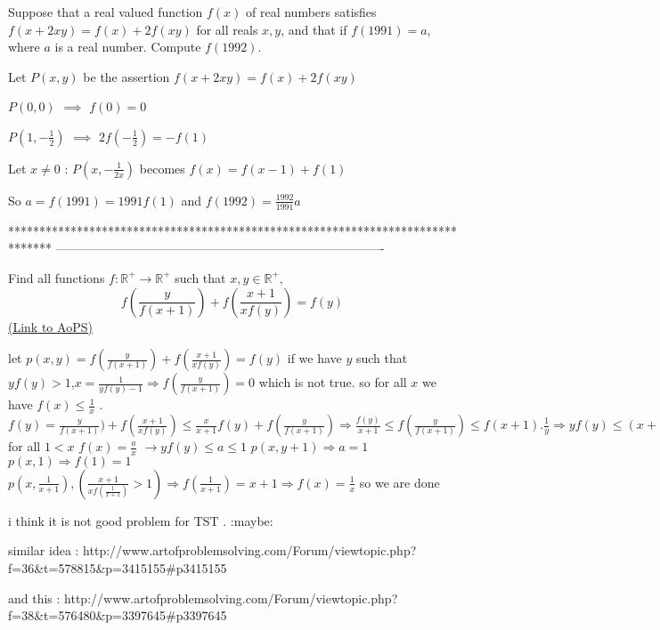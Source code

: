 \begin{solution}
	\begin{tcolorbox}Suppose that a real valued function $f(x)$ of real numbers satisfies
$f(x+2xy)=f(x)+2f(xy)$
for all reals $x,y$, and that if $f(1991)=a$, where $a$ is a real number. Compute $f(1992)$.\end{tcolorbox}
Let $P(x,y)$ be the assertion $f(x+2xy)=f(x)+2f(xy)$

$P(0,0)$ $\implies$ $f(0)=0$

$P(1,-\frac 12)$ $\implies$ $2f(-\frac 12)=-f(1)$

Let $x\ne 0$ : $P(x,-\frac 1{2x})$ becomes $f(x)=f(x-1)+f(1)$

So $a=f(1991)=1991f(1)$ and $\boxed{f(1992)=\frac{1992}{1991}a}$
\end{solution}
*******************************************************************************
-------------------------------------------------------------------------------

\begin{problem}
	Find all functions $f:\mathbb{R}^{+}\rightarrow \mathbb{R}^{+}$ such that 
$x,y\in \mathbb{R}^{+},$ \[ f\left(\frac{y}{f(x+1)}\right)+f\left(\frac{x+1}{xf(y)}\right)=f(y) \]
	\flushright \href{https://artofproblemsolving.com/community/c6h590564}{(Link to AoPS)}
\end{problem}



\begin{solution}
	let $p(x,y)= f(\frac{y}{f(x+1)})+f(\frac{x+1}{xf(y)})=f(y)$
if we have $y$ such that $yf(y)> 1$,$x=\frac{1}{yf(y)-1}\Rightarrow f(\frac{y}{f(x+1)})=0$ which is not true.
so for all $x$ we have $f(x)\leq \frac{1}{x}$ .
$ f(y)=\frac{y}{f(x+1)})+f(\frac{x+1}{xf(y)})\leq \frac{x}{x+1}f(y)+f(\frac{y}{f(x+1)})\Rightarrow \frac{f(y)}{x+1}\leq f(\frac{y}{f(x+1)})\leq f(x+1).\frac{1}{y}\Rightarrow yf(y)\leq (x+1)f(x+1)\Rightarrow $ for all $1<x$ $f(x)=\frac{a}{x}$
$\rightarrow yf(y)\leq a\leq 1$ 
$p(x,y+1)\Rightarrow a=1$ 
 $p(x,1)\Rightarrow f(1)=1$ 
$p(x,\frac{1}{x+1}),(\frac{x+1}{xf(\frac{1}{x+1})}> 1)\Rightarrow f(\frac{1}{x+1})=x+1\Rightarrow f(x)=\frac{1}{x}$ 
so we are done
\end{solution}



\begin{solution}
	i think it is not good problem for TST .  :maybe: 

similar idea : http://www.artofproblemsolving.com/Forum/viewtopic.php?f=36&t=578815&p=3415155#p3415155

and this : http://www.artofproblemsolving.com/Forum/viewtopic.php?f=38&t=576480&p=3397645#p3397645
\end{solution}



